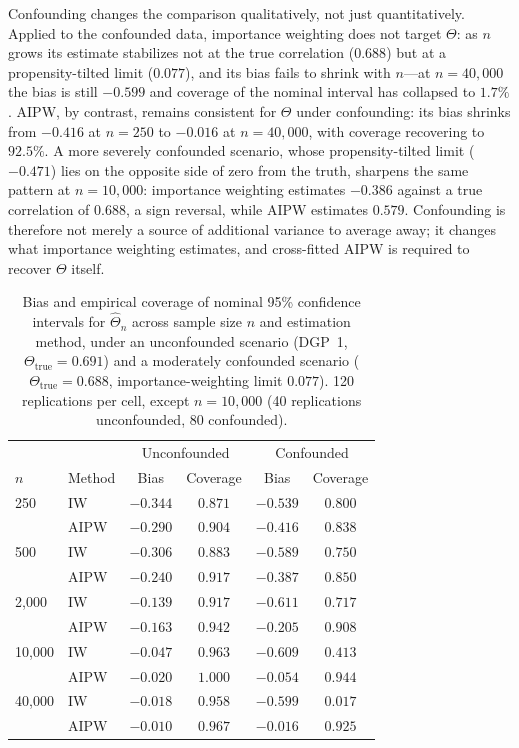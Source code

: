 \documentclass{article}
\begin{document}
Confounding changes the comparison qualitatively, not just quantitatively. Applied
to the confounded data, importance weighting does not target $\Theta$: as $n$
grows its estimate stabilizes not at the true correlation ($0.688$) but at a
propensity-tilted limit ($0.077$), and its bias fails to shrink with $n$---at
$n = 40{,}000$ the bias is still $-0.599$ and coverage of the nominal interval has
collapsed to $1.7\%$. AIPW, by contrast, remains consistent for $\Theta$ under
confounding: its bias shrinks from $-0.416$ at $n = 250$ to $-0.016$ at
$n = 40{,}000$, with coverage recovering to $92.5\%$. A more severely confounded
scenario, whose propensity-tilted limit ($-0.471$) lies on the opposite side of
zero from the truth, sharpens the same pattern at $n = 10{,}000$: importance
weighting estimates $-0.386$ against a true correlation of $0.688$, a sign
reversal, while AIPW estimates $0.579$. Confounding is therefore not merely a
source of additional variance to average away; it changes what importance
weighting estimates, and cross-fitted AIPW is required to recover $\Theta$ itself.

\begin{table}[h]
\centering
\caption{Bias and empirical coverage of nominal 95\% confidence intervals for
$\hat{\Theta}_n$ across sample size $n$ and estimation method, under an
unconfounded scenario (DGP~1, $\Theta_{\mathrm{true}} = 0.691$) and a moderately
confounded scenario ($\Theta_{\mathrm{true}} = 0.688$, importance-weighting limit
$0.077$). 120 replications per cell, except $n = 10{,}000$ (40 replications
unconfounded, 80 confounded).}
\label{tab:finite-sample}
\begin{tabular}{llcccc}
\toprule
& & \multicolumn{2}{c}{Unconfounded} & \multicolumn{2}{c}{Confounded} \\
$n$ & Method & Bias & Coverage & Bias & Coverage \\
\midrule
250      & IW   & $-0.344$ & $0.871$ & $-0.539$ & $0.800$ \\
         & AIPW & $-0.290$ & $0.904$ & $-0.416$ & $0.838$ \\
500      & IW   & $-0.306$ & $0.883$ & $-0.589$ & $0.750$ \\
         & AIPW & $-0.240$ & $0.917$ & $-0.387$ & $0.850$ \\
2{,}000  & IW   & $-0.139$ & $0.917$ & $-0.611$ & $0.717$ \\
         & AIPW & $-0.163$ & $0.942$ & $-0.205$ & $0.908$ \\
10{,}000 & IW   & $-0.047$ & $0.963$ & $-0.609$ & $0.413$ \\
         & AIPW & $-0.020$ & $1.000$ & $-0.054$ & $0.944$ \\
40{,}000 & IW   & $-0.018$ & $0.958$ & $-0.599$ & $0.017$ \\
         & AIPW & $-0.010$ & $0.967$ & $-0.016$ & $0.925$ \\
\bottomrule
\end{tabular}
\end{table}
\end{document}
